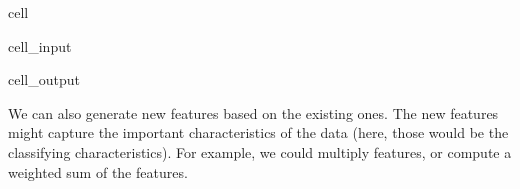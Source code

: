 \documentclass[letterpaper,10pt,english]{jupyterBook}
\begin{document}
\begin{sphinxuseclass}{cell}\begin{sphinxVerbatimInput}

\begin{sphinxuseclass}{cell_input}
\begin{sphinxVerbatim}[commandchars=\\\{\}]
   
   
     
                 
\end{sphinxVerbatim}

\end{sphinxuseclass}\end{sphinxVerbatimInput}
\begin{sphinxVerbatimOutput}

\begin{sphinxuseclass}{cell_output}
\noindent{}

\end{sphinxuseclass}\end{sphinxVerbatimOutput}

\end{sphinxuseclass}
\sphinxAtStartPar
We can also generate new features based on the existing ones. The new features might capture the important characteristics of the data (here, those would be the classifying characteristics). For example, we could multiply features, or compute a weighted sum of the features.
\end{document}
